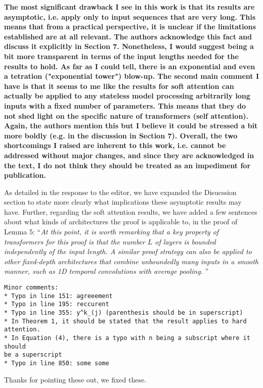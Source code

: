 \documentclass[11pt,a4paper]{article}
\newcommand\response[1]{{\color{blue}#1}}
\newcommand\newtext[1]{``\textit{#1}''}
\newcommand\original[1]{\textbf{#1}}
\begin{document}
\original{The most significant drawback I see in this work is that its results are
asymptotic, i.e. apply only to input sequences that are very long.  This
means that from a practical perspective, it is unclear if the limitations
established are at all relevant.  The authors acknowledge this fact and
discuss it explicitly in Section 7.  Nonetheless, I would suggest being a
bit more transparent in terms of the input lengths needed for the results to
hold.  As far as I could tell, there is an exponential and even a tetration
("exponential tower") blow-up.  The second main comment I have is that it
seems to me like the results for soft attention can actually be applied to
any stateless model processing arbitrarily long inputs with a fixed number
of parameters.  This means that they do not shed light on the specific
nature of transformers (self attention).  Again, the authors mention this
but I believe it could be stressed a bit more boldly (e.g. in the discussion
in Section 7).  Overall, the two shortcomings I raised are inherent to this
work, i.e. cannot be addressed without major changes, and since they are
acknowledged in the text, I do not think they should be treated as an
impediment for publication.}

\response{As detailed in the response to the editor, we have expanded the Disucssion section to state more clearly what implications these asymptotic results may have. Further, regarding the soft attention results, we have added a few sentences about what kinds of architectures the proof is applicable to, in the proof of Lemma 5: \newtext{At this point, it is worth remarking that a key property of transformers for this proof is that the number $L$ of layers is bounded independently of the input length.
A similar proof strategy can also be applied to other fixed-depth architectures that combine unboundedly many inputs in a smooth manner, such as 1D temporal convolutions with average pooling.
}}

\begin{verbatim}
Minor comments:
* Typo in line 151: agreeement
* Typo in line 195: reccurent
* Typo in line 355: y^k_(j) (parenthesis should be in superscript)
* In Theorem 1, it should be stated that the result applies to hard
attention.
* In Equation (4), there is a typo with n being a subscript where it should
be a superscript
* Typo in line 850: some some
\end{verbatim}

\response{Thanks for pointing these out, we fixed these.}
\end{document}
